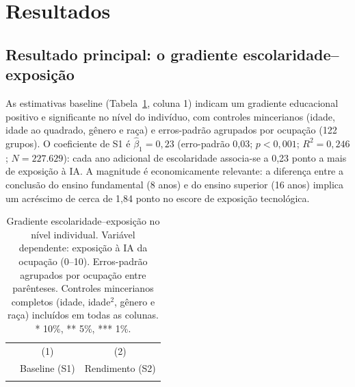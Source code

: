 \section{Resultados}
\label{sec:resultados}

\subsection{Resultado principal: o gradiente escolaridade--exposição}

As estimativas baseline (Tabela~\ref{tab:gradiente}, coluna 1) indicam um gradiente educacional positivo e significante no nível do indivíduo, com controles mincerianos (idade, idade ao quadrado, gênero e raça) e erros-padrão agrupados por ocupação (122 grupos). O coeficiente de S1 é $\hat{\beta}_1 = 0{,}23$ (erro-padrão 0{,}03; $p < 0{,}001$; $R^2 = 0{,}246$; $N = 227.629$): cada ano adicional de escolaridade associa-se a 0{,}23 ponto a mais de exposição à IA. A magnitude é economicamente relevante: a diferença entre a conclusão do ensino fundamental (8 anos) e do ensino superior (16 anos) implica um acréscimo de cerca de 1{,}84 ponto no escore de exposição tecnológica.

\begin{table}[htbp]
\centering
\caption{Gradiente escolaridade--exposição no nível individual. Variável dependente: exposição à IA da ocupação (0--10). Erros-padrão agrupados por ocupação entre parênteses. Controles mincerianos completos (idade, idade$^2$, gênero e raça) incluídos em todas as colunas. * 10\%, ** 5\%, *** 1\%.}
\label{tab:gradiente}
\begin{tabular}{lcc}
\toprule
 & (1) & (2) \\
 & Baseline (S1) & Rendimento (S2) \\
\midrule
 \\
\bottomrule
\end{tabular}
\end{table}

